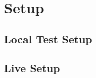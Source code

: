 \chapter{Setup}\label{chap:setup}
\chapterstart



\section{Local Test Setup}\label{sec:local}


\section{Live Setup}\label{sec:live}



\chapterend

